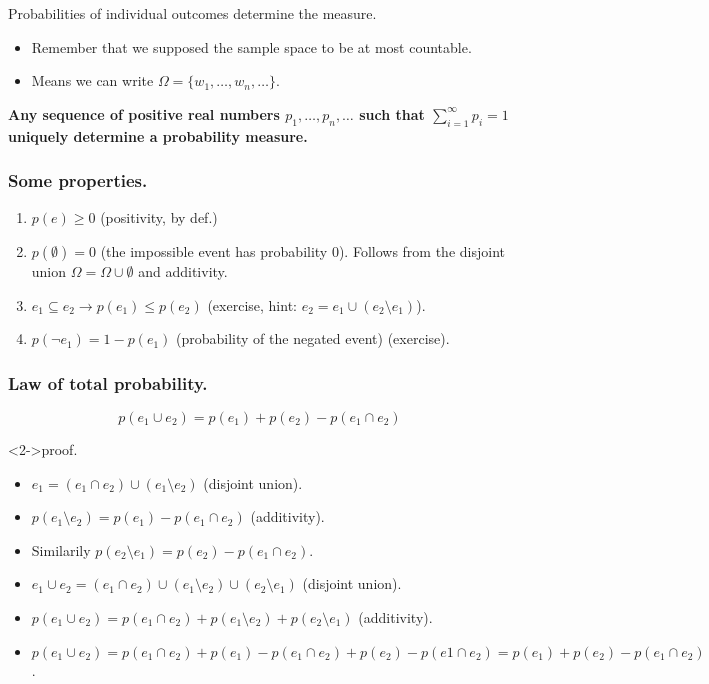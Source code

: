 \documentclass{beamer}
\begin{document}
\begin{frame}{Probabilities of individual outcomes determine the measure.}
  \begin{itemize}
  \item Remember that we supposed the sample space to be at most countable.
  \item Means we can write $\Omega = \{ w_1, \dots, w_n, \dots\}$.
  \end{itemize}

  {\bf Any sequence of positive real numbers $p_1, \dots, p_n, \dots$ such that $\sum^{\infty}_{i=1} p_i = 1$ uniquely determine a probability measure.}
\end{frame}

\begin{frame}
  \frametitle{Some properties.}
  \begin{enumerate}
  \item $p(e) \ge 0$ (positivity, by def.)
  \item $p(\emptyset) = 0$ (the impossible event has probability $0$). Follows from the disjoint union $\Omega = \Omega \cup \emptyset$ and additivity.
  \item $e_1 \subseteq e_2 \rightarrow p(e_1) \le p(e_2)$ (exercise, hint: $e_2 = e_1 \cup (e_2 \setminus e_1)$).
  \item $p(\neg e_1) = 1 - p(e_1)$ (probability of the negated event) (exercise).
  \end{enumerate}
\end{frame}

\begin{frame}
  \frametitle{Law of total probability.}
  \[ p(e_1 \cup e_2) = p(e_1) + p(e_2) - p(e_1 \cap e_2)\]

  \begin{block}<2->{proof.}
    \begin{itemize}
    \item<3-> $e_1 = (e_1 \cap e_2) \cup (e_1 \setminus e_2)$ (disjoint union).
    \item<4-> $p(e_1 \setminus e_2) = p(e_1) - p(e_1 \cap e_2)$ (additivity).
    \item<5-> Similarily $p(e_2 \setminus e_1) = p(e_2) - p(e_1 \cap e_2)$.
    \item<6-> $e_1 \cup e_2 = (e_1 \cap e_2) \cup (e_1 \setminus e_2) \cup (e_2 \setminus e_1)$ (disjoint union).
    \item<7-> $p(e_1 \cup e_2) = p(e_1 \cap e_2) + p(e_1 \setminus e_2) + p(e_2 \setminus e_1)$ (additivity).
    \item<8-> $p(e_1 \cup e_2) = p(e_1 \cap e_2) + p(e_1) - p(e_1 \cap e_2) + p(e_2) - p(e1 \cap e_2) = p(e_1) + p(e_2) - p(e_1 \cap e_2)$.
    \end{itemize}
  \end{block}
\end{frame}
\end{document}
